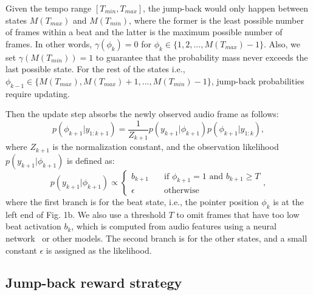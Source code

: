 \documentclass{article}
\begin{document}
Given the tempo range $[T_{min}, T_{max}]$, the jump-back would only happen between states $M(T_{max})$ and $M(T_{min})$, where the former is the least possible number of frames within a beat and the latter is the maximum possible number of frames. In other words, $\gamma({\phi_{k}})=0$ for $\phi_{k}\in \{1,2,...,M(T_{max})-1\}$. Also, we set $\gamma(M(T_{min}))=1$ to guarantee that the probability mass never exceeds the last possible state. For the rest of the states i.e., $\phi_{k-1}\in \{M(T_{max}),M(T_{max})+1,...,M(T_{min})-1\}$, jump-back probabilities require updating. 

Then the update step absorbs the newly observed audio frame as follows:
\begin{equation}
p(\phi_{k+1}|y_{1:k+1})= \frac{1}{Z_{k+1}}p(y_{k+1}|\phi_{k+1})p(\phi_{k+1}|y_{1:k}) ,
\end{equation}
where $Z_{k+1}$ is the normalization constant, and the observation likelihood $p(y_{k+1}|\phi_{k+1})$ is defined as: 
\begin{equation}
    p(y_{k+1} | \phi_{k+1}) \propto
      \left\{
        \begin{array}{ll}
            b_{k+1} & \quad \text{if } \phi_{k+1}=1\text{  and  } b_{k+1} \geq T \\
            \epsilon & \quad \text{otherwise}
        \end{array}
      \right. ,
\end{equation}
where the first branch is for the beat state, i.e., the pointer position $\phi_k$ is at the left end of Fig. 1b. We also use a threshold $T$ to omit frames that have too low beat activation $b_{k}$, which is computed from audio features using a neural network~\cite{Heydari:2} or other models. The second branch is for the other states, and a small constant $\epsilon$ is assigned as the likelihood. 






\subsection{Jump-back reward strategy}
\label{ssec:Jump back reward}
\end{document}
